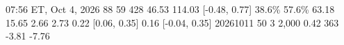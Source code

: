 \providecommand{\defval}[2]{\expandafter\def\csname val@#1\endcsname{#2}}
\defval{v4_frozen_et}{07:56 ET, Oct 4, 2026}  %
\defval{v4_games}{88}  %
\defval{v4_games_with_fills}{59}  %
\defval{v4_fills}{428}  %
\defval{v4_pnl60_usd}{46.53}  %
\defval{v4_pnlset_usd}{114.03}  %
\defval{v4_excl5_ci}{[-0.48, 0.77]}  %
\defval{v4_share_pos_88}{38.6\%}  %
\defval{v4_share_pos_59}{57.6\%}  %
\defval{v4_spread_usd}{63.18}  %
\defval{v4_adverse_usd}{15.65}  %
\defval{v4_set_c}{2.66}  %
\defval{v4_3c_c}{2.73}  %
\defval{v4_sr_game_60}{0.22}  %
\defval{v4_sr_game_60_ci}{[0.06, 0.35]}  %
\defval{v4_sr_game_set}{0.16}  %
\defval{v4_sr_game_set_ci}{[-0.04, 0.35]}  %
\defval{v4_seed}{20261011}  %
\defval{v4_cap}{50}  %
\defval{v4_armb_c}{3}  %
\defval{v4_reps}{2,000}  %
\defval{v4_rc_min_p}{0.42}  %
\defval{v4_rc_min_n}{363}  %
\defval{sr_oos_A_recomp}{-3.81}  %
\defval{sr_oos_B_recomp}{-7.76}  %
